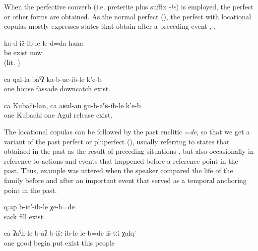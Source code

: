 When the perfective converb (i.e. preterite plus suffix -\textit{le}) is employed, the perfect or other forms are obtained. As the normal perfect (), the perfect with locational copulas mostly expresses states that obtain after a preceding event , .
%
\begin{exe}
	\ex	\label{ex:‎(Then I relaxed) and we lived normally}
	\gll	ka-d-iž-ib-le	le-d=da	hana\\
		be	exist	now\\
	\glt	{} (lit. )

	\ex	\label{ex:(The plant) has covered one wall of the house (by growing upwards).}
	\gll	ca	qal-la	baˁʔ	ka-b-uc-ib-le	k'e-b\\
		one	house	fassade	downcatch	exist.\\
	\glt	{}
	
		\ex	\label{ex:‎One Kubachi person, one Agul person are buried (in Sanzhi)}
	\gll	ca	Kubači-lan,	ca	aʁul-an	gu-b-aˁʁ-ib-le	k'e-b\\
		one	Kubachi	one	Agul	release	exist.\\
	\glt	{}
\end{exe}


The locational copulas can be followed by the past enclitic =\textit{de}, so that we get a variant of the past perfect or pluperfect (), usually referring to states that obtained in the past as the result of preceding situations , but also occasionally in reference to actions and events that happened before a reference point in the past. Thus, example  was uttered when the speaker compared the life of the family before and after an important event that served as a temporal anchoring point in the past.
%
\begin{exe}
	\ex	\label{ex:The sack was full filled}
	\gll	qːap	b-ic'-ib-le	χe-b=de\\
		sack	fill	exist.\\
	\glt	{}

	\ex	\label{ex:The people started well}
	\gll	ca	ʡaˁħ-le	b-aʔ	b-išː-ib-le	le-b=de	iš-tːi	χalq'\\
		one	good	begin	put	exist	this	people\\
	\glt	{}
\end{exe}

